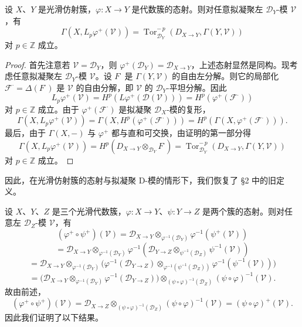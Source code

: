 \begin{proposition}\label{prop:4.3.8}
设 $X$、$Y$ 是光滑仿射簇，$\varphi:X\to Y$ 是代数簇的态射。则对任意拟凝聚左 $\mathcal{D}_Y$-模 $\mathcal{V}$，有
$$\Gamma(X,L_p\varphi^+(\mathcal{V}))=\operatorname{Tor}^{-\,p}_{\mathcal{D}_Y}(D_{X\to Y},\Gamma(Y,\mathcal{V}))$$
对 $p\in\mathbb{Z}$ 成立。
\end{proposition}

\begin{proof}
首先注意若 $\mathcal{V}=\mathcal{D}_Y$，则 $\varphi^+(\mathcal{D}_Y)=\mathcal{D}_{X\to Y}$，上述态射显然是同构。现考虑任意拟凝聚左 $\mathcal{D}_Y$-模 $\mathcal{V}$。设 $F^\cdot$ 是 $\Gamma(Y,\mathcal{V})$ 的自由左分解。则它的局部化 $\mathcal{F}^\cdot=\Delta(F^\cdot)$ 是 $\mathcal{V}$ 的自由分解，即 $\mathcal{V}$ 的 $\mathcal{D}_Y$-平坦分解。因此
$$L_p\varphi^+(\mathcal{V})=H^p(L\varphi^+(\mathcal{D}(\mathcal{V})))=H^p(\varphi^+(\mathcal{F}^\cdot))$$
对 $p\in\mathbb{Z}$ 成立。由于 $\varphi^+(\mathcal{F}^\cdot)$ 是拟凝聚 $\mathcal{D}_X$-模的复形，
$$\Gamma(X,L_p\varphi^+(\mathcal{V}))=\Gamma(X,H^p(\varphi^+(\mathcal{F}^\cdot)))=H^p(\Gamma(X,\varphi^+(\mathcal{F}^\cdot))).$$
最后，由于 $\Gamma(X,-)$ 与 $\varphi^+$ 都与直和可交换，由证明的第一部分得
$$\Gamma(X,L_p\varphi^+(\mathcal{V}))=H^p(D_{X\to Y}\otimes_{\mathcal{D}_Y}F^\cdot)
=\operatorname{Tor}^{-\,p}_{\mathcal{D}_Y}(D_{X\to Y},\Gamma(Y,\mathcal{V}))$$
对 $p\in\mathbb{Z}$ 成立。
\end{proof}

因此，在光滑仿射簇的态射与拟凝聚 D-模的情形下，我们恢复了 §2 中的旧定义。

设 $X$、$Y$、$Z$ 是三个光滑代数簇，$\varphi:X\to Y$、$\psi:Y\to Z$ 是两个簇的态射。则对任意左 $\mathcal{D}_Z$-模 $\mathcal{V}$，有
$$(\varphi^+\circ\psi^+)(\mathcal{V})=\mathcal{D}_{X\to Y}\otimes_{\varphi^{-1}(\mathcal{D}_Y)}\varphi^{-1}(\psi^+(\mathcal{V}))$$
$$=\mathcal{D}_{X\to Y}\otimes_{\varphi^{-1}(\mathcal{D}_Y)}\varphi^{-1}
(\mathcal{D}_{Y\to Z}\otimes_{\psi^{-1}(\mathcal{D}_Z)}\psi^{-1}(\mathcal{V}))$$
$$=\mathcal{D}_{X\to Y}\otimes_{\varphi^{-1}(\mathcal{D}_Y)}
\bigl(\varphi^{-1}(\mathcal{D}_{Y\to Z})\otimes_{\varphi^{-1}(\psi^{-1}(\mathcal{D}_Z))}\varphi^{-1}(\psi^{-1}(\mathcal{V}))\bigr)$$
$$=\bigl(\mathcal{D}_{X\to Y}\otimes_{\varphi^{-1}(\mathcal{D}_Y)}\varphi^{-1}(\mathcal{D}_{Y\to Z})\bigr)
\otimes_{(\psi\circ\varphi)^{-1}(\mathcal{D}_Z)}(\psi\circ\varphi)^{-1}(\mathcal{V}).$$
故由前述，
$$(\varphi^+\circ\psi^+)(\mathcal{V})=\mathcal{D}_{X\to Z}
\otimes_{(\psi\circ\varphi)^{-1}(\mathcal{D}_Z)}(\psi\circ\varphi)^{-1}(\mathcal{V})=(\psi\circ\varphi)^+(\mathcal{V}).$$
因此我们证明了以下结果。

